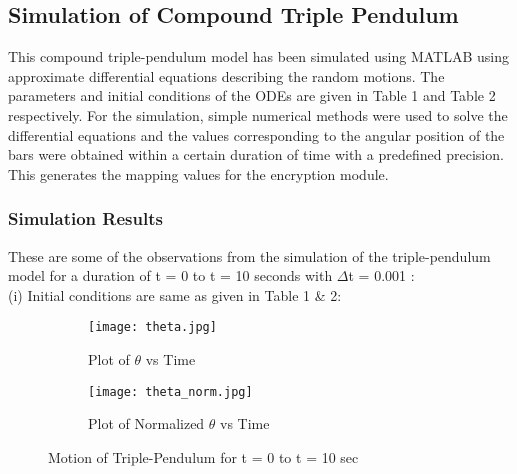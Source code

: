 % 
% 

\subsection{Simulation of Compound Triple Pendulum}
This compound triple-pendulum model has been simulated using MATLAB using approximate differential equations describing the random motions. The parameters and initial conditions of the ODEs are given in Table 1 and Table 2 respectively. For the simulation, simple numerical methods were used to solve the differential equations and the values corresponding to the angular position of the bars were obtained within a certain duration of time with a predefined precision. This generates the mapping values for the encryption module. 

% 
% 
% 
% 
\subsubsection{Simulation Results}
These are some of the observations from the simulation of the triple-pendulum model for a duration of t = 0 to t = 10 seconds with $\Delta$t = 0.001 :\\
(i) Initial conditions are same as given in Table 1 \& 2:\\
 
\begin{figure}[H]
\begin{subfigure}{0.5\textwidth}
\texttt{[image: theta.jpg]}
\caption{Plot of ${\theta}$ vs Time}\label{fig:theta}
\end{subfigure}
\begin{subfigure}{0.5\textwidth}
\texttt{[image: theta\_norm.jpg]}
\caption{Plot of Normalized ${\theta}$ vs Time}\label{fig:theta_norm}
\end{subfigure}
\caption{Motion of Triple-Pendulum for t = 0 to t = 10 sec}\label{fig:image3}
\end{figure}


